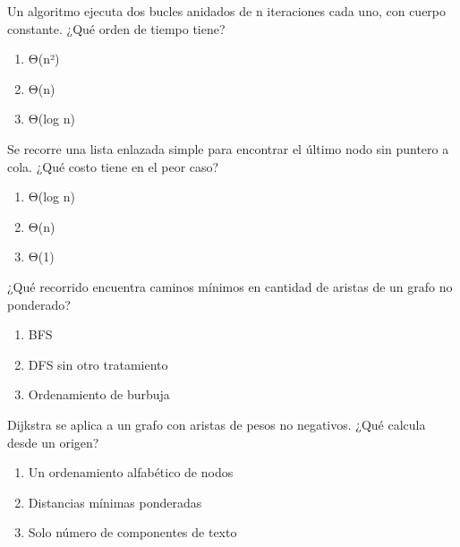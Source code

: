 \noindent\begin{minipage}{\linewidth}\setlength{\parskip}{4pt}\label{q:S-074}
Un algoritmo ejecuta dos bucles anidados de n iteraciones cada uno, con cuerpo constante. ¿Qué orden de tiempo tiene?
\begin{enumerate}[label=\Alph*),nosep]
\item Θ(n²)
\item Θ(n)
\item Θ(log n)
\end{enumerate}\end{minipage}\par\medskip

\noindent\begin{minipage}{\linewidth}\setlength{\parskip}{4pt}\label{q:S-075}
Se recorre una lista enlazada simple para encontrar el último nodo sin puntero a cola. ¿Qué costo tiene en el peor caso?
\begin{enumerate}[label=\Alph*),nosep]
\item Θ(log n)
\item Θ(n)
\item Θ(1)
\end{enumerate}\end{minipage}\par\medskip

\noindent\begin{minipage}{\linewidth}\setlength{\parskip}{4pt}\label{q:S-076}
¿Qué recorrido encuentra caminos mínimos en cantidad de aristas de un grafo no ponderado?
\begin{enumerate}[label=\Alph*),nosep]
\item BFS
\item DFS sin otro tratamiento
\item Ordenamiento de burbuja
\end{enumerate}\end{minipage}\par\medskip

\noindent\begin{minipage}{\linewidth}\setlength{\parskip}{4pt}\label{q:S-077}
Dijkstra se aplica a un grafo con aristas de pesos no negativos. ¿Qué calcula desde un origen?
\begin{enumerate}[label=\Alph*),nosep]
\item Un ordenamiento alfabético de nodos
\item Distancias mínimas ponderadas
\item Solo número de componentes de texto
\end{enumerate}\end{minipage}\par\medskip

